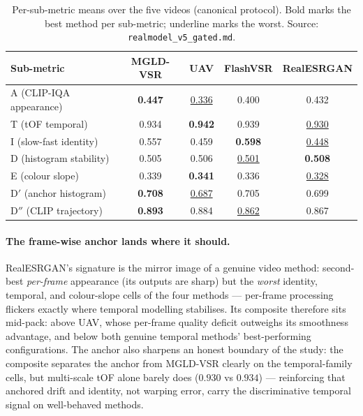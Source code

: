 \begin{table}[h]
\centering
\caption{Per-sub-metric means over the five videos (canonical protocol).
Bold marks the best method per sub-metric; underline marks the worst. Source:
\texttt{realmodel\_v5\_gated.md}.}
\label{tab:exp:submetrics}
\begin{tabular}{lcccc}
\hline
\textbf{Sub-metric} & \textbf{MGLD-VSR} & \textbf{UAV} & \textbf{FlashVSR} & \textbf{RealESRGAN} \\
\hline
A (CLIP-IQA appearance) & \textbf{0.447} & \underline{0.336} & 0.400 & 0.432 \\
T (tOF temporal) & 0.934 & \textbf{0.942} & 0.939 & \underline{0.930} \\
I (slow-fast identity) & 0.557 & 0.459 & \textbf{0.598} & \underline{0.448} \\
D (histogram stability) & 0.505 & 0.506 & \underline{0.501} & \textbf{0.508} \\
E (colour slope) & 0.339 & \textbf{0.341} & 0.336 & \underline{0.328} \\
D$'$ (anchor histogram) & \textbf{0.708} & \underline{0.687} & 0.705 & 0.699 \\
D$''$ (CLIP trajectory) & \textbf{0.893} & 0.884 & \underline{0.862} & 0.867 \\
\hline
\end{tabular}
\end{table}

\paragraph{The frame-wise anchor lands where it should.} RealESRGAN's
signature is the mirror image of a genuine video method: second-best
\emph{per-frame} appearance (its outputs are sharp) but the \emph{worst}
identity, temporal, and colour-slope cells of the four methods --- per-frame
processing flickers exactly where temporal modelling stabilises. Its composite
therefore sits mid-pack: above UAV, whose per-frame quality deficit outweighs
its smoothness advantage, and below both genuine temporal methods'
best-performing configurations. The anchor also sharpens an honest boundary of
the study: the composite separates the anchor from MGLD-VSR clearly on the
temporal-family cells, but multi-scale tOF alone barely does ($0.930$ vs
$0.934$) --- reinforcing that anchored drift and identity, not warping error,
carry the discriminative temporal signal on well-behaved methods.

